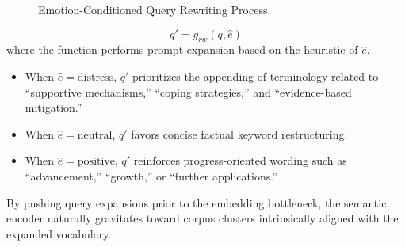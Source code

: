 \documentclass[conference]{IEEEtran}
\begin{document}
\begin{figure}[htbp]
\centering
{}
\caption{Emotion-Conditioned Query Rewriting Process.}
\label{fig:rewrite}
\end{figure}

\begin{equation}
q' = g_{rw}(q, \hat{e})
\end{equation}
where the function performs prompt expansion based on the heuristic of $\hat{e}$. 
\begin{itemize}
    \item When $\hat{e} = \text{distress}$, $q'$ prioritizes the appending of terminology related to ``supportive mechanisms,'' ``coping strategies,'' and ``evidence-based mitigation.''
    \item When $\hat{e} = \text{neutral}$, $q'$ favors concise factual keyword restructuring.
    \item When $\hat{e} = \text{positive}$, $q'$ reinforces progress-oriented wording such as ``advancement,'' ``growth,'' or ``further applications.''
\end{itemize}
By pushing query expansions prior to the embedding bottleneck, the semantic encoder naturally gravitates toward corpus clusters intrinsically aligned with the expanded vocabulary.
\end{document}
